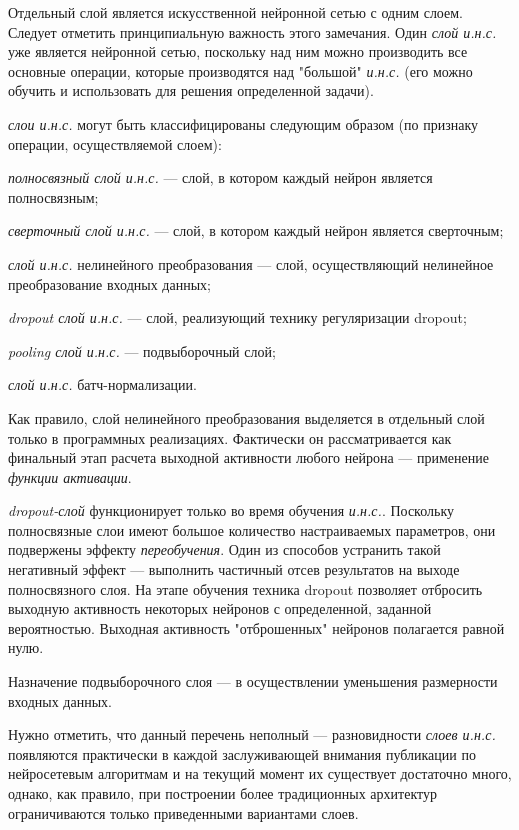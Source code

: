 Отдельный слой является искусственной нейронной сетью с одним слоем.
Следует отметить принципиальную важность этого замечания. Один \textit{слой и.н.с.} уже является нейронной сетью, поскольку над ним можно производить все основные операции, которые производятся над "большой"{} \textit{и.н.с.} (его можно обучить и использовать для решения определенной задачи).

\textit{слои и.н.с.} могут быть классифицированы следующим образом (по признаку операции, осуществляемой слоем):
\begin{textitemize}
	\item \textit{полносвязный слой и.н.с.} --- слой, в котором каждый нейрон является полносвязным;
	\item \textit{сверточный слой и.н.с.} --- слой, в котором каждый нейрон является сверточным;
	\item \textit{слой и.н.с.} нелинейного преобразования --- слой, осуществляющий нелинейное преобразование входных данных;
	\item \textit{dropout слой и.н.с.} --- слой, реализующий технику регуляризации dropout;
	\item \textit{pooling слой и.н.с.} --- подвыборочный слой;
	\item \textit{слой и.н.с.} батч-нормализации.
\end{textitemize}

Как правило, слой нелинейного преобразования выделяется в отдельный слой только в программных реализациях. Фактически он рассматривается как финальный этап расчета выходной активности любого нейрона --- применение \textit{функции активации}.

\textit{dropout-слой} функционирует только во время обучения \textit{и.н.с.}. Поскольку полносвязные слои имеют большое количество настраиваемых параметров, они подвержены эффекту \textit{переобучения}. Один из способов устранить такой негативный эффект --- выполнить частичный отсев результатов на выходе полносвязного слоя. На этапе обучения техника dropout позволяет отбросить выходную активность некоторых нейронов с определенной, заданной вероятностью. Выходная активность "отброшенных"{} нейронов полагается равной нулю.

Назначение подвыборочного слоя --- в осуществлении уменьшения размерности входных данных.

Нужно отметить, что данный перечень неполный --- разновидности \textit{слоев и.н.с.} появляются практически в каждой заслуживающей внимания публикации по нейросетевым алгоритмам и на текущий момент их существует достаточно много, однако, как правило, при построении более традиционных архитектур ограничиваются только приведенными вариантами слоев.

